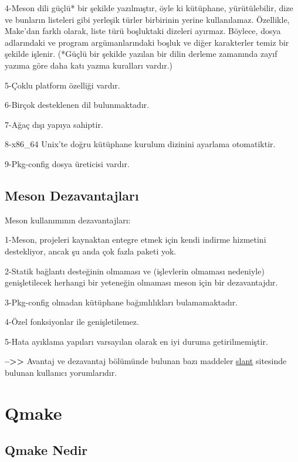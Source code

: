 \documentclass[
]{book}
\begin{document}
4-Meson dili güçlü* bir şekilde yazılmıştır, öyle ki kütüphane, yürütülebilir, dize ve bunların listeleri gibi yerleşik türler birbirinin yerine kullanılamaz. Özellikle, Make'dan farklı olarak, liste türü boşluktaki dizeleri ayırmaz. Böylece, dosya adlarındaki ve program argümanlarındaki boşluk ve diğer karakterler temiz bir şekilde işlenir.
(*Güçlü bir şekilde yazılan bir dilin derleme zamanında zayıf yazıma göre daha katı yazma kuralları vardır.)

5-Çoklu platform özelliği vardır.

6-Birçok desteklenen dil bulunmaktadır.

7-Ağaç dışı yapıya sahiptir.

8-x86\_64 Unix'te doğru kütüphane kurulum dizinini ayarlama otomatiktir.

9-Pkg-config dosya üreticisi vardır.

\hypertarget{meson-dezavantajlarux131}{%
\section{Meson Dezavantajları}\label{meson-dezavantajlarux131}}

Meson kullanımının dezavantajları:

1-Meson, projeleri kaynaktan entegre etmek için kendi indirme hizmetini destekliyor, ancak şu anda çok fazla paketi yok.

2-Statik bağlantı desteğinin olmaması ve (işlevlerin olmaması nedeniyle) genişletilecek herhangi bir yeteneğin olmaması meson için bir dezavantajdır.

3-Pkg-config olmadan kütüphane bağımlılıkları bulamamaktadır.

4-Özel fonksiyonlar ile genişletilemez.

5-Hata ayıklama yapıları varsayılan olarak en iyi duruma getirilmemiştir.

\textbf{--\textgreater\textgreater{}} Avantaj ve dezavantaj bölümünde bulunan bazı maddeler \href{https://www.slant.co/topics/4263/viewpoints/14/~open-source-build-systems-for-c-c~meson}{slant} sitesinde bulunan kullanıcı yorumlarıdır.

\hypertarget{qmake}{%
\chapter{Qmake}\label{qmake}}

\hypertarget{qmake-nedir}{%
\section{Qmake Nedir}\label{qmake-nedir}}
\end{document}
